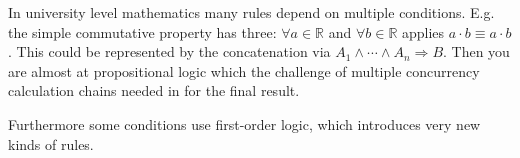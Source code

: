 \documentclass{scrartcl}
\theoremstyle{definition}
\begin{document}
In university level mathematics many rules depend on multiple conditions.
E.g. the simple commutative property has three: $\forall a \in \mathbb{R}$ and $\forall b \in \mathbb{R}$ applies $a\cdot b \equiv a\cdot b$.
This could be represented by the concatenation via $A_1 \wedge \cdots \wedge A_n \Longrightarrow B$.
Then you are almost at propositional logic which the challenge of multiple concurrency calculation chains needed in for the final result.

Furthermore some conditions use first-order logic, which introduces very new kinds of rules.


\printbibliography
\end{document}
